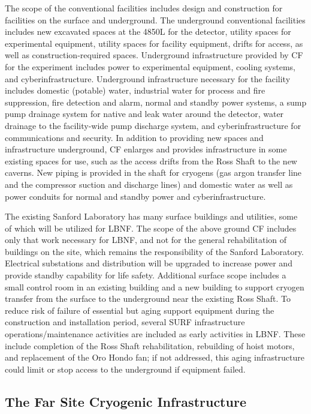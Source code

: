 The scope of the conventional facilities includes design and construction for facilities on the surface and underground. The underground conventional facilities includes new excavated spaces at the 4850L for the detector, utility spaces for experimental equipment, utility spaces for facility equipment, drifts for access, as well as construction-required spaces. Underground infrastructure provided by CF for the experiment includes power to experimental equipment, cooling systems, and cyberinfrastructure. Underground infrastructure necessary for the facility includes domestic (potable) water, industrial water for process and fire suppression, fire detection and alarm, normal and standby power systems, a sump pump drainage system for native and leak water around the detector, water drainage to the facility-wide pump discharge system, and cyberinfrastructure for communications and security.  In addition to providing new spaces and infrastructure underground, CF enlarges and provides infrastructure in some existing spaces for use, such as the access drifts from the Ross Shaft to the new caverns. New piping is provided in the shaft for cryogens (gas argon transfer line and the compressor suction and discharge lines) and domestic water as well as power conduits for normal and standby power and cyberinfrastructure. 

The existing Sanford Laboratory has many surface buildings and utilities, some of which will be utilized for LBNF. The scope of the above ground CF includes only that work necessary for LBNF, and not for the general rehabilitation of buildings on the site, which remains the responsibility of the Sanford Laboratory. Electrical substations and distribution will be upgraded to increase power and provide standby capability for life safety. Additional surface scope includes a small control room in an existing building and a new building to support cryogen transfer from the surface to the underground near the existing Ross Shaft.
To reduce risk of failure of essential but aging support equipment during the construction and installation period, several SURF infrastructure operations/maintenance activities are included as early activities in LBNF. These include completion of the Ross Shaft rehabilitation, rebuilding of hoist motors, and replacement of the Oro Hondo fan; if not addressed, this aging infrastructure could limit or stop access to the underground if equipment failed. 



\subsection{The Far Site Cryogenic Infrastructure}
\label{sec:fs-facil-cryo}

